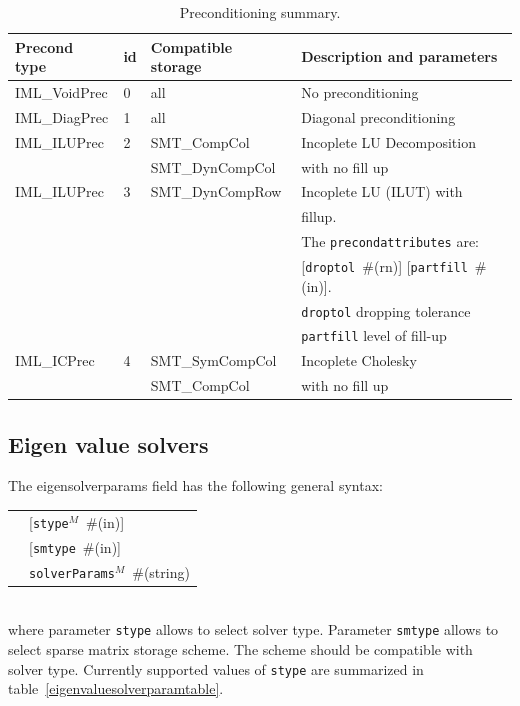 \documentclass[a4paper]{article}
\makeatletter
\newcommand{\param}[1]{\texttt{#1}} %
\newcommand{\optional}[1]{[#1]} %
\newcommand{\field}[2]{\param{#1}~\#{\tiny(#2)}} %
\newcommand{\optField}[2]{\optional{\field{#1}{#2}}}
\newenvironment{record}[1][]{\begin{tabular}{|ll}}{\end{tabular}\\}
\newcommand{\recentry}[2]{{#1}&{#2}\\}
\newcounter{rcc}
\newenvironment{record}[1][\textwidth]{\setcounter{rcc}{0}\begin{tabular*}{#1}{|ll@{\extracolsep{\fill}}r}}{\end{tabular*}\\}
\newcommand{\recentry}[2]{\ifthenelse{\value{rcc}>0}{&$\backslash$ \\}{\setcounter{rcc}{1}}{#1}&{#2}}
\makeatother
\begin{document}
\begin{table}[ht]
\begin{center}
\begin{tabular}{|l|l|l|l|}
\hline
Precond type & id & Compatible storage & Description and parameters \\
\hline\hline
IML\_VoidPrec &0& all & No preconditioning\\
\hline
IML\_DiagPrec &1& all & Diagonal preconditioning\\
\hline
IML\_ILUPrec  &2& SMT\_CompCol & Incoplete LU Decomposition\\
              & & SMT\_DynCompCol&with no fill up\\
\hline
IML\_ILUPrec  &3& SMT\_DynCompRow & Incoplete LU (ILUT) with\\
              & &                 &  fillup. \\
              & &                 & The \param{precondattributes} are:\\
              & &                 & \optField{droptol}{rn}
\optField{partfill}{in}.\\
              & &                 & \param{droptol} dropping
tolerance\\
              & &                 & \param{partfill} level of
fill-up\\
\hline
IML\_ICPrec   &4& SMT\_SymCompCol&Incoplete Cholesky\\
              & & SMT\_CompCol   &with no fill up\\
\hline
\end{tabular}
\caption{Preconditioning summary.}
\label{precondtable}
\end{center}
\end{table}

\subsection{Eigen value solvers}
\label{eigensolverssection}
The eigensolverparams field has the following general syntax:\\
\begin{record}
  \recentry{\hspace{20mm}}{\optField{stype$^M$}{in}}
  \recentry{}{\optField{smtype}{in}}
  \recentry{}{\field{solverParams$^M$}{string}}
\end{record}
where parameter \param{stype} allows to select solver type. Parameter \param{smtype} allows to select sparse matrix storage
scheme. The scheme should be compatible with solver type. Currently supported values of \param{stype} are summarized in table~\ref{eigenvaluesolverparamtable}.
\end{document}
